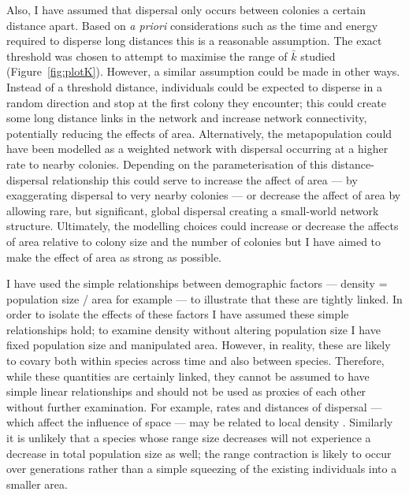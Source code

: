 Also, I have assumed that dispersal only occurs between colonies a certain distance apart.
Based on \emph{a priori} considerations such as the time and energy required to disperse long distances this is a reasonable assumption.
The exact threshold was chosen to attempt to maximise the range of $\bar{k}$ studied (Figure~\ref{fig:plotK}).
However, a similar assumption could be made in other ways.
Instead of a threshold distance, individuals could be expected to disperse in a random direction and stop at the first colony they encounter; this could create some long distance links in the network and increase network connectivity, potentially reducing the effects of area.
Alternatively, the metapopulation could have been modelled as a weighted network with dispersal occurring at a higher rate to nearby colonies.
Depending on the parameterisation of this distance-dispersal relationship this could serve to increase the affect of area --- by exaggerating dispersal to very nearby colonies --- or decrease the affect of area by allowing rare, but significant, global dispersal creating a small-world network structure.
Ultimately, the modelling choices could increase or decrease the affects of area relative to colony size and the number of colonies but I have aimed to make the effect of area as strong as possible.





I have used the simple relationships between demographic factors --- density = population size / area for example --- to illustrate that these are tightly linked.
In order to isolate the effects of these factors I have assumed these simple relationships hold; to examine density without altering population size I have fixed population size and manipulated area.
However, in reality, these are likely to covary both within species across time and also between species.
Therefore, while these quantities are certainly linked, they cannot be assumed to have simple linear relationships and should not be used as proxies of each other without further examination.
For example, rates and distances of dispersal --- which affect the influence of space --- may be related to local density \cite{marjamaki2013local}.
Similarly it is unlikely that a species whose range size decreases will not experience a decrease in total population size as well; the range contraction is likely to occur over generations rather than a simple squeezing of the existing individuals into a smaller area.




